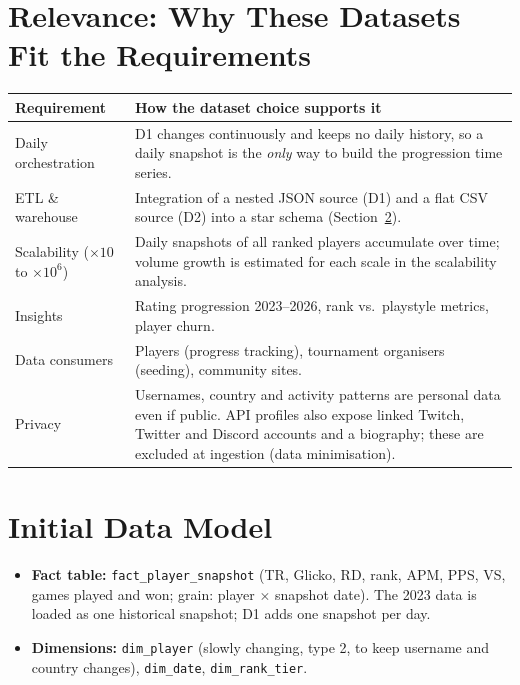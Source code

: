 \documentclass[11pt,a4paper]{article}
\begin{document}
\section{Relevance: Why These Datasets Fit the Requirements}
\begin{tabularx}{\textwidth}{@{}p{3.4cm}Y@{}}
\toprule
\textbf{Requirement} & \textbf{How the dataset choice supports it} \\
\midrule
Daily orchestration &
D1 changes continuously and keeps no daily history, so a daily snapshot is
the \emph{only} way to build the progression time series. \\
ETL \& warehouse &
Integration of a nested JSON source (D1) and a flat CSV source (D2) into a
star schema (Section~\ref{sec:model}). \\
Scalability ($\times10$ to $\times10^6$) &
Daily snapshots of all ranked players accumulate over time; volume growth
is estimated for each scale in the scalability analysis. \\
Insights &
Rating progression 2023--2026, rank vs.\ playstyle metrics, player churn. \\
Data consumers &
Players (progress tracking), tournament organisers (seeding),
community sites. \\
Privacy &
Usernames, country and activity patterns are personal data even if public.
API profiles also expose linked Twitch, Twitter and Discord accounts and a
biography; these are excluded at ingestion (data minimisation). \\
\bottomrule
\end{tabularx}

\section{Initial Data Model}\label{sec:model}
\begin{itemize}
  \item \textbf{Fact table:} \texttt{fact\_player\_snapshot}
        (TR, Glicko, RD, rank, APM, PPS, VS, games played and won;
        grain: player $\times$ snapshot date). The 2023 data is loaded as
        one historical snapshot; D1 adds one snapshot per day.
  \item \textbf{Dimensions:} \texttt{dim\_player} (slowly changing, type 2,
        to keep username and country changes), \texttt{dim\_date},
        \texttt{dim\_rank\_tier}.
\end{itemize}
\end{document}
